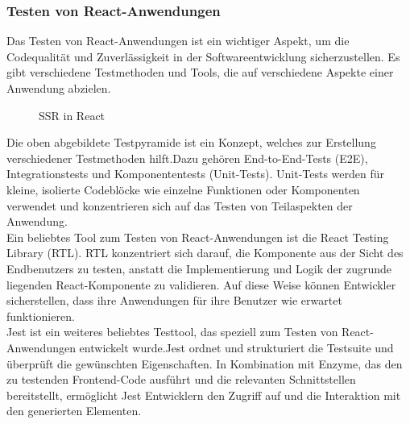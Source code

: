 \subsubsection{Testen von React-Anwendungen}
Das Testen von React-Anwendungen ist ein wichtiger Aspekt, um die Codequalität und Zuverlässigkeit in der Softwareentwicklung sicherzustellen. Es gibt verschiedene Testmethoden und Tools, die auf verschiedene Aspekte einer Anwendung abzielen.\\
\begin{figure}[htbp]
	\centering
	\caption{SSR in React}
\end{figure}
Die oben abgebildete Testpyramide ist ein Konzept, welches zur Erstellung verschiedener Testmethoden hilft.Dazu gehören End-to-End-Tests (E2E), Integrationstests und Komponententests (Unit-Tests). Unit-Tests werden für kleine, isolierte Codeblöcke wie einzelne Funktionen oder Komponenten verwendet und konzentrieren sich auf das Testen von Teilaspekten der Anwendung.\\
Ein beliebtes Tool zum Testen von React-Anwendungen ist die React Testing Library (RTL). RTL konzentriert sich darauf, die Komponente aus der Sicht des Endbenutzers zu testen, anstatt die Implementierung und Logik der zugrunde liegenden React-Komponente zu validieren. Auf diese Weise können Entwickler sicherstellen, dass ihre Anwendungen für ihre Benutzer wie erwartet funktionieren.\cite{react-test-runebook}\\ 
Jest ist ein weiteres beliebtes Testtool, das speziell zum Testen von React-Anwendungen entwickelt wurde.Jest ordnet und strukturiert die Testsuite und überprüft die gewünschten Eigenschaften. In Kombination mit Enzyme, das den zu testenden Frontend-Code ausführt und die relevanten Schnittstellen bereitstellt, ermöglicht Jest Entwicklern den Zugriff auf und die Interaktion mit den generierten Elementen.\cite{react-test-ix}\\

